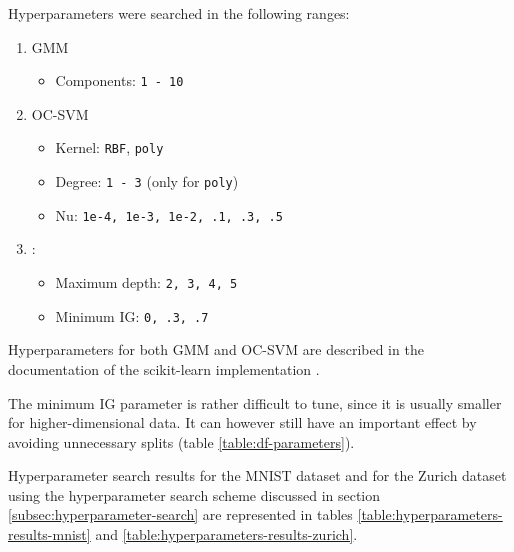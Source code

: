 \documentclass[10pt]{article}
\begin{document}
Hyperparameters were searched in the following ranges:
\begin{enumerate}
    \item \gls{GMM}
    \begin{itemize}
        \item Components: \texttt{1 - 10}
    \end{itemize}
    \item \gls{OC-SVM}
    \begin{itemize}
        \item Kernel: \texttt{\gls{RBF}}, \texttt{poly}
        \item Degree: \texttt{1 - 3} (only for \texttt{poly})
        \item Nu: \texttt{1e-4, 1e-3, 1e-2, .1, .3, .5}
    \end{itemize}
    \item {}:
    \begin{itemize}
        \item Maximum depth: \texttt{2, 3, 4, 5}
        \item Minimum \gls{IG}: \texttt{0, .3, .7}
    \end{itemize}
\end{enumerate}

Hyperparameters for both \gls{GMM} and \gls{OC-SVM}  are described in the documentation of the scikit-learn implementation \cite{scikit-learn}.

The minimum \acrlong{IG} parameter is rather difficult to tune, since it is usually smaller for higher-dimensional data. It can however still have an important effect by avoiding unnecessary splits (table \ref{table:df-parameters}).

Hyperparameter search results for the \gls{MNIST} dataset and for the Zurich dataset using the hyperparameter search scheme discussed in section \ref{subsec:hyperparameter-search} are represented in tables \ref{table:hyperparameters-results-mnist} and \ref{table:hyperparameters-results-zurich}.
\end{document}
